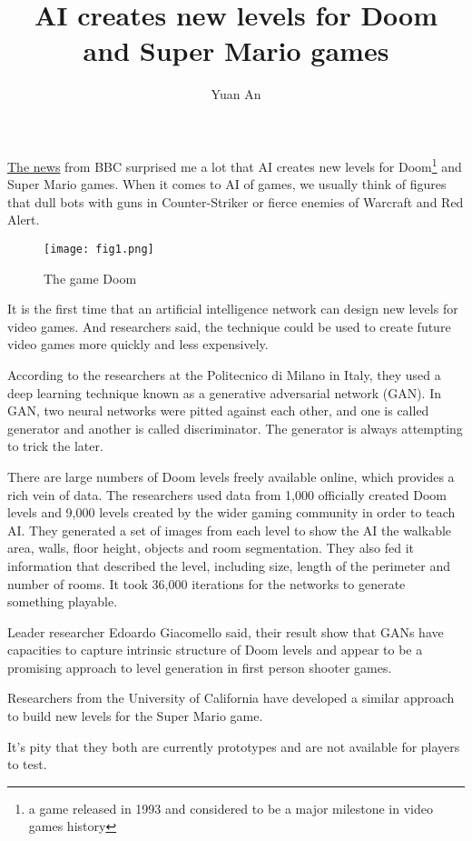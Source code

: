 \documentclass[a4paper,12pt,twocolumn]{article}
\title{AI creates new levels for Doom and Super Mario games}
\author{Yuan An}
\begin{document}
\maketitle
\href{http://www.bbc.com/news/technology-44040007}{The news} from BBC surprised me a lot that AI creates new levels for Doom\footnote{a game released in 1993 and considered to be a major milestone in video games history} and Super Mario games\cite{BBCnews}. When it comes to AI of games, we usually think of figures that dull bots with guns in Counter-Striker or fierce enemies of Warcraft and Red Alert.
\begin{figure}[h]
	\centering
	\texttt{[image: fig1.png]}
	\caption{The game Doom}\label{fig1}
\end{figure}
\par
It is the first time that an artificial intelligence network can design new levels for video games. And researchers said, the technique could be used to create future video games more quickly and less expensively.
\par
According to the researchers at the Politecnico di Milano in Italy, they used a deep learning technique known as a generative adversarial network (GAN). In GAN, two neural networks were pitted against each other, and one is called generator and another is called discriminator. The generator is always attempting to trick the later.
\par
There are large numbers of Doom levels freely available online, which provides a rich vein of data. The researchers used data from 1,000 officially created Doom levels and 9,000 levels created by the wider gaming community in order to teach AI. They generated a set of images from each level to show the AI the walkable area, walls, floor height, objects and room segmentation. They also fed it information that described the level, including size, length of the perimeter and number of rooms. It took 36,000 iterations for the networks to generate something playable.
\par
Leader researcher Edoardo Giacomello said, their result show that GANs have capacities to capture intrinsic structure of Doom levels and appear to be a promising approach to level generation in first person shooter games.
\par
Researchers from the University of California have developed a similar approach to build new levels for the Super Mario game.
\par
It's pity that they both are currently  prototypes and are not available for players to test.


\end{document}
